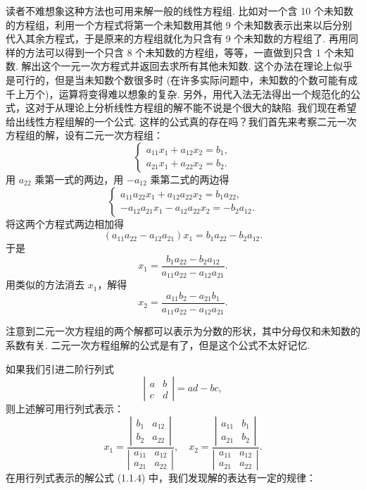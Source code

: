 \documentclass[UTF8,12pt,a4paper,fontset=fandol]{ctexart}
\begin{document}
读者不难想象这种方法也可用来解一般的线性方程组. 比如对一个含 10 个未知数的方程组，利用一个方程式将第一个未知数用其他 9 个未知数表示出来以后分别代入其余方程式，于是原来的方程组就化为只含有 9 个未知数的方程组了. 再用同样的方法可以得到一个只含 8 个未知数的方程组，等等，一直做到只含 1 个未知数. 解出这个一元一次方程式并返回去求所有其他未知数. 这个办法在理论上似乎是可行的，但是当未知数个数很多时 (在许多实际问题中，未知数的个数可能有成千上万个)，运算将变得难以想象的复杂. 另外，用代入法无法得出一个规范化的公式，这对于从理论上分析线性方程组的解不能不说是个很大的缺陷. 我们现在希望给出线性方程组解的一个公式. 这样的公式真的存在吗？我们首先来考察二元一次方程组的解，设有二元一次方程组：
\begin{equation}
\left\{
\begin{array}{l}
a_{11}x_1+a_{12}x_2=b_1,\\
a_{21}x_1+a_{22}x_2=b_2.
\end{array}
\right.
\tag{1.1.3}
\end{equation}
用 $a_{22}$ 乘第一式的两边，用 $-a_{12}$ 乘第二式的两边得
\[
\left\{
\begin{array}{l}
a_{11}a_{22}x_1+a_{12}a_{22}x_2=b_1a_{22},\\
-a_{12}a_{21}x_1-a_{12}a_{22}x_2=-b_2a_{12}.
\end{array}
\right.
\]
将这两个方程式两边相加得
\[
(a_{11}a_{22}-a_{12}a_{21})x_1=b_1a_{22}-b_2a_{12}.
\]
于是
\[
x_1=\frac{b_1a_{22}-b_2a_{12}}{a_{11}a_{22}-a_{12}a_{21}}.
\]
用类似的方法消去 $x_1$，解得
\[
x_2=\frac{a_{11}b_2-a_{21}b_1}{a_{11}a_{22}-a_{12}a_{21}}.
\]

注意到二元一次方程组的两个解都可以表示为分数的形状，其中分母仅和未知数的系数有关. 二元一次方程组解的公式是有了，但是这个公式不太好记忆.

如果我们引进二阶行列式
\[
\left|\begin{array}{cc}
a & b\\
c & d
\end{array}\right|=ad-bc,
\]
则上述解可用行列式表示：
\begin{equation}
x_1=
\frac{\left|\begin{array}{cc}
b_1 & a_{12}\\
b_2 & a_{22}
\end{array}\right|}
{\left|\begin{array}{cc}
a_{11} & a_{12}\\
a_{21} & a_{22}
\end{array}\right|},\quad
x_2=
\frac{\left|\begin{array}{cc}
a_{11} & b_1\\
a_{21} & b_2
\end{array}\right|}
{\left|\begin{array}{cc}
a_{11} & a_{12}\\
a_{21} & a_{22}
\end{array}\right|}.
\tag{1.1.4}
\end{equation}
在用行列式表示的解公式 (1.1.4) 中，我们发现解的表达有一定的规律：
\end{document}
